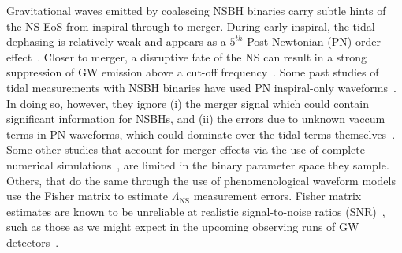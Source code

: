 \documentclass[aps,prd,amsmath,floats,floatfix, twocolumn,
superscriptaddress,nofootinbib,showpacs]{revtex4-1}
\newcommand{\lambdans}{\Lambda_\mathrm{NS}}
\begin{document}
Gravitational waves emitted by coalescing NSBH binaries carry subtle hints of
the NS EoS from inspiral through to merger. During early inspiral, the tidal
dephasing is relatively weak and appears as a $5^{th}$ Post-Newtonian (PN)
order effect~\cite{Vines2011}. Closer to merger, a disruptive fate of the NS
can result in a strong suppression of GW emission above a cut-off 
frequency~\cite{Pannarale:2015jia}. Some past studies of tidal measurements
with NSBH binaries have used PN inspiral-only waveforms~\cite{Maselli:2013rza}.
In doing so, however, they ignore (i) the merger signal which could contain significant
information for NSBHs, and (ii) the errors due to unknown vaccum terms in PN 
waveforms, which could dominate over the tidal terms themselves~\cite{Barkett2015,
Yagi:2014}.
% 
Some other studies that account for merger effects via the use of complete
numerical simulations~\cite{Foucart:2013psa}, are limited in the binary
parameter space they sample.
% 
Others, that do the same through the use of phenomenological waveform
models~\cite{Lackey2011,Lackey:2013axa} use the Fisher matrix to estimate
$\lambdans$ measurement errors. Fisher matrix estimates are known to be
unreliable at realistic signal-to-noise ratios (SNR)~\cite{Vallisneri:2007ev},
such as those as we might expect in the upcoming observing runs of GW
detectors~\cite{Abadie:2010cf}.




\end{document}
